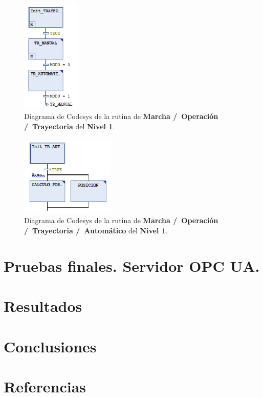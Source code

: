 \documentclass[11pt]{article}
\begin{document}
\begin{figure}[!h]
	\centering
	\includegraphics[width=0.25\textwidth]{images/imagen_34_codesys_nivel_1_marcha_operacion_trayectoria.png}
	\caption{Diagrama de Codesys de la rutina de \textbf{Marcha /\ Operación /\ Trayectoria} del \textbf{Nivel 1}.}
	\label{fig:codesys_nivel_1_marcha_operacion_trayectoria}
\end{figure}

\begin{figure}[!h]
	\centering
	\includegraphics[width=0.4\textwidth]{images/imagen_35_codesys_nivel_1_marcha_operacion_trayectoria_automatico.png}
	\caption{Diagrama de Codesys de la rutina de \textbf{Marcha /\ Operación /\ Trayectoria /\ Automático} del \textbf{Nivel 1}.}
	\label{fig:codesys_nivel_1_marcha_operacion_trayectoria_automatico}
\end{figure}

\section{Pruebas finales. Servidor OPC UA.}
\section{Resultados}
\section{Conclusiones}
\section{Referencias}
\end{document}
